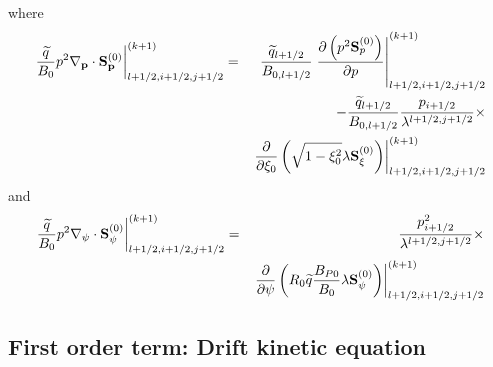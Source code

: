 where
\begin{eqnarray}
\left. \frac{\widetilde{q}}{B_{0}}p^{2}\nabla _{\mathbf{p}}\cdot \mathbf{S}_{%
\mathbf{p}}^{\left( 0\right) }\right| _{l+1/2,i+1/2,j+1/2}^{(k+1)} &=&\frac{%
\widetilde{q}_{l+1/2}}{B_{0,l+1/2}}\left. \frac{\partial \left( p^{2}\mathbf{
S}_{p}^{\left( 0\right) }\right) }{\partial p}\right|
_{l+1/2,i+1/2,j+1/2}^{(k+1)}  \nonumber \\
&&-\frac{\widetilde{q}_{l+1/2}}{B_{0,l+1/2}}\frac{p_{i+1/2}}{\lambda
^{l+1/2,j+1/2}}\times   \nonumber \\
&&\left. \frac{\partial }{\partial \xi _{0}}\left( \sqrt{1-\xi _{0}^{2}}%
\lambda \mathbf{S}_{\xi }^{\left( 0\right) }\right) \right|
_{l+1/2,i+1/2,j+1/2}^{(k+1)}
\end{eqnarray}
and
\begin{eqnarray}
\left. \frac{\widetilde{q}}{B_{0}}p^{2}\nabla _{\psi }\cdot \mathbf{S}_{\psi
}^{\left( 0\right) }\right| _{l+1/2,i+1/2,j+1/2}^{(k+1)} &=&\frac{%
p_{i+1/2}^{2}}{\lambda ^{l+1/2,j+1/2}}\times   \nonumber \\
&&\left. \frac{\partial }{\partial \psi }\left( R_{0}\widetilde{q}\frac{%
B_{P0}}{B_{0}}\lambda \mathbf{S}_{\psi }^{\left( 0\right) }\right) \right|
_{l+1/2,i+1/2,j+1/2}^{(k+1)}
\end{eqnarray}

\subsection{First order term: Drift kinetic equation}

